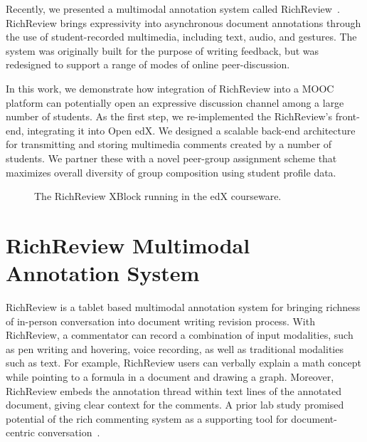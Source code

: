 \documentclass{sigchi}
\begin{document}
Recently, we presented a multimodal annotation system called RichReview~\cite{yoon2014richreview}.
RichReview brings expressivity into asynchronous document annotations through the use of student-recorded multimedia, including text, audio, and gestures.
The system was originally built for the purpose of writing feedback, but was redesigned to support a range of modes of online peer-discussion.

In this work, we demonstrate how integration of RichReview into a MOOC platform can potentially open an expressive discussion channel among a large number of students.
As the first step, we re-implemented the RichReview's front-end, integrating it into Open edX. We designed a scalable back-end architecture for transmitting and storing multimedia comments created by a number of students.
We partner these with a novel peer-group assignment scheme that maximizes overall diversity of group composition using student profile data.

\begin{figure}[!h]
\centering
{
\setlength{\fboxsep}{0pt}
\setlength{\fboxrule}{0.5pt}
}
\caption{The RichReview XBlock running in the edX courseware.}
\label{fig:screenshot}
\end{figure}


\section{RichReview Multimodal Annotation System}
RichReview is a tablet based multimodal annotation system for bringing richness of in-person conversation into document writing revision process.
With RichReview, a commentator can record a combination of input modalities, such as pen writing and hovering, voice recording, as well as traditional modalities such as text.
For example, RichReview users can verbally explain a math concept while pointing to a formula in a document and drawing a graph.
Moreover, RichReview embeds the annotation thread within text lines of the annotated document, giving clear context for the comments.
A prior lab study promised potential of the rich commenting system as a supporting tool for document-centric conversation~\cite{yoon2014richreview}.
\end{document}
